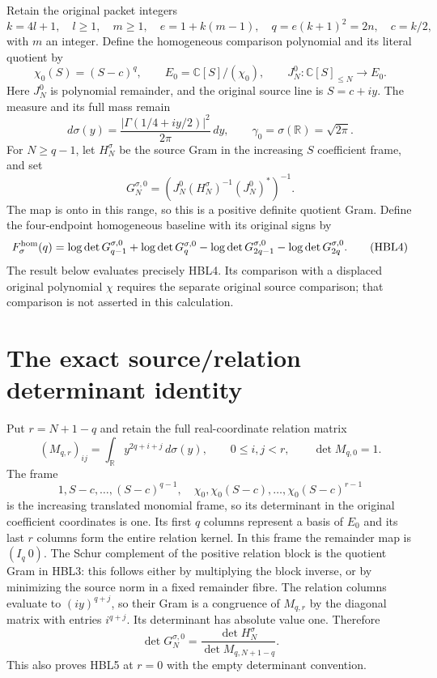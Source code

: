 \documentclass[11pt,a4paper]{article}
\newcommand{\C}{\mathbb C}
\newcommand{\R}{\mathbb R}
\begin{document}
Retain the original packet integers
\[
 k=4l+1,\quad l\ge1,\quad m\ge1,\quad
 e=1+k(m-1),\quad q=e(k+1)^2=2n,\quad c=k/2,
\]
with $m$ an integer. Define the homogeneous comparison polynomial and
its literal quotient by
\[
 \chi_0(S)=(S-c)^q,\qquad E_0=\C[S]/(\chi_0),\qquad
 J_N^0:\C[S]_{\le N}\longrightarrow E_0.
 \tag{HBL1}
\]
Here $J_N^0$ is polynomial remainder, and the original source line is
$S=c+iy$. The measure and its full mass remain
\[
 d\sigma(y)=\frac{|\Gamma(1/4+iy/2)|^2}{2\pi}\,dy,
 \qquad \gamma_0=\sigma(\R)=\sqrt{2\pi}.
 \tag{HBL2}
\]
For $N\ge q-1$, let $H_N^\sigma$ be the source Gram in the increasing
$S$ coefficient frame, and set
\[
 G_N^{\sigma,0}=(J_N^0(H_N^\sigma)^{-1}(J_N^0)^*)^{-1}.
 \tag{HBL3}
\]
The map is onto in this range, so this is a positive definite quotient
Gram. Define the four-endpoint homogeneous baseline with its original
signs by
\[
 F_\sigma^{\rm hom}(q)=
 \log\det G_{q-1}^{\sigma,0}+\log\det G_q^{\sigma,0}
 -\log\det G_{2q-1}^{\sigma,0}-\log\det G_{2q}^{\sigma,0}.
 \tag{HBL4}
\]
The result below evaluates precisely HBL4. Its comparison with a
displaced original polynomial $\chi$ requires the separate original
source comparison; that comparison is not asserted in this calculation.

\section{The exact source/relation determinant identity}

Put $r=N+1-q$ and retain the full real-coordinate relation matrix
\[
 (M_{q,r})_{ij}=\int_{\R}y^{2q+i+j}\,d\sigma(y),
 \qquad 0\le i,j<r,
 \qquad \det M_{q,0}=1.
\]
The frame
\[
 1,S-c,\ldots,(S-c)^{q-1},\quad
 \chi_0,\chi_0(S-c),\ldots,\chi_0(S-c)^{r-1}
\]
is the increasing translated monomial frame, so its determinant in
the original coefficient coordinates is one. Its first $q$ columns
represent a basis of $E_0$ and its last $r$ columns form the entire
relation kernel. In this frame the remainder map is $(I_q\ 0)$.
The Schur complement of the positive relation block is the quotient
Gram in HBL3: this follows either by multiplying the block inverse,
or by minimizing the source norm in a fixed remainder fibre.
The relation columns evaluate to $(iy)^{q+j}$, so their Gram is a
congruence of $M_{q,r}$ by the diagonal matrix with entries $i^{q+j}$.
Its determinant has absolute value one. Therefore
\[
 \boxed{\det G_N^{\sigma,0}
             =\frac{\det H_N^\sigma}{\det M_{q,N+1-q}}.}
 \tag{HBL5}
\]
This also proves HBL5 at $r=0$ with the empty determinant convention.
\end{document}
